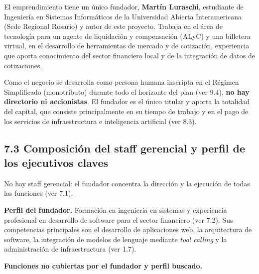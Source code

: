 El emprendimiento tiene un único fundador, \textbf{Martín Luraschi},
estudiante de Ingeniería en Sistemas Informáticos de la Universidad
Abierta Interamericana (Sede Regional Rosario) y autor de este proyecto.
Trabaja en el área de tecnología para un agente de liquidación y
compensación (ALyC) y una billetera virtual, en el desarrollo de
herramientas de mercado y de cotización, experiencia que aporta
conocimiento del sector financiero local y de la integración de datos de
cotizaciones.

Como el negocio se desarrolla como persona humana inscripta en el
Régimen Simplificado (monotributo) durante todo el horizonte del plan
(ver 9.4), \textbf{no hay directorio ni accionistas}. El fundador es el
único titular y aporta la totalidad del capital, que consiste
principalmente en su tiempo de trabajo y en el pago de los servicios de
infraestructura e inteligencia artificial (ver 8.3).

\subsection*{7.3 Composición del staff gerencial y perfil de los
ejecutivos
claves}\label{composiciuxf3n-del-staff-gerencial-y-perfil-de-los-ejecutivos-claves}

No hay staff gerencial: el fundador concentra la dirección y la
ejecución de todas las funciones (ver 7.1).

\textbf{Perfil del fundador.} Formación en ingeniería en sistemas y
experiencia profesional en desarrollo de software para el sector
financiero (ver 7.2). Sus competencias principales son el desarrollo de
aplicaciones web, la arquitectura de software, la integración de modelos
de lenguaje mediante \emph{tool calling} y la administración de
infraestructura (ver 1.7).

\textbf{Funciones no cubiertas por el fundador y perfil buscado.}


